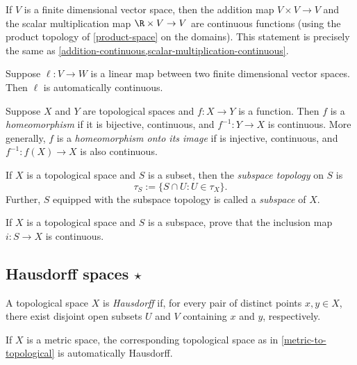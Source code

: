 \begin{example}
	If $V$ is a finite dimensional vector space, then the addition map $V \times V \to V$ and the scalar multiplication map $\R \times V \to V$ are continuous functions (using the product topology of \cref{product-space} on the domains). This statement is precisely the same as \cref{addition-continuous,scalar-multiplication-continuous}. 
\end{example}

\begin{example}
	Suppose $\ell : V \to W$ is a linear map between two finite dimensional vector spaces. Then $\ell$ is automatically continuous. 
\end{example}

\begin{definition}[Homeomorphisms]
	Suppose $X$ and $Y$ are topological spaces and $f : X \to Y$ is a function. Then $f$ is a \emph{homeomorphism} if it is bijective, continuous, and $f^{-1} : Y \to X$ is continuous. More generally, $f$ is a \emph{homeomorphism onto its image} if is injective, continuous, and $f^{-1} : f(X) \to X$ is also continuous. 
\end{definition}

\begin{definition}[Subspace] \label{subspace-topology}
	If $X$ is a topological space and $S$ is a subset, then the \emph{subspace topology} on $S$ is
	\[ \tau_S := \{ S \cap U : U \in \tau_X \}. \]
	Further, $S$ equipped with the subspace topology is called a \emph{subspace} of $X$. 
\end{definition}

\begin{exercise}
	If $X$ is a topological space and $S$ is a subspace, prove that the inclusion map $i : S \to X$ is continuous. 
\end{exercise}

\subsection{Hausdorff spaces \texorpdfstring{$\star$}{*}}

\begin{definition}[Hausdorff]
	A topological space $X$ is \emph{Hausdorff} if, for every pair of distinct points $x, y \in X$, there exist disjoint open subsets $U$ and $V$ containing $x$ and $y$, respectively. 
\end{definition}

\begin{example}
	If $X$ is a metric space, the corresponding topological space as in \cref{metric-to-topological} is automatically Hausdorff. 
\end{example}


